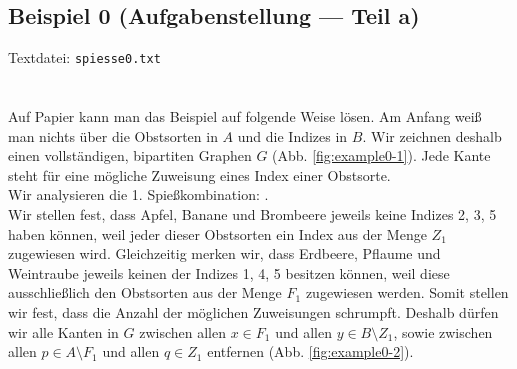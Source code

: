 \subsection{Beispiel 0 (Aufgabenstellung --- Teil a)}\label{example:0}
Textdatei: \texttt{spiesse0.txt}\\
\noindent
{}\\

\noindent
{}\\

Auf Papier kann man das Beispiel auf folgende Weise lösen.
Am Anfang weiß man nichts über die Obstsorten in $A$ und die Indizes in $B$.
Wir zeichnen deshalb einen vollständigen, bipartiten Graphen $G$ (Abb. \ref{fig:example0-1}).
Jede Kante steht für eine mögliche Zuweisung eines Index einer Obstsorte.\\

Wir analysieren die 1. Spießkombination:
.\\
Wir stellen fest, dass Apfel, Banane und Brombeere jeweils keine Indizes 2, 3, 5 haben können,
weil jeder dieser Obstsorten ein Index aus der Menge $Z_1$ zugewiesen wird.
Gleichzeitig merken wir, dass Erdbeere, Pflaume und Weintraube jeweils keinen der Indizes
1, 4, 5 besitzen können, weil diese ausschließlich den Obstsorten aus der Menge $F_1$ zugewiesen werden.
Somit stellen wir fest, dass die Anzahl der möglichen Zuweisungen schrumpft.
Deshalb dürfen wir alle Kanten in $G$ zwischen allen $x \in F_1$ und allen $y \in B \setminus Z_1$,
sowie zwischen allen $p \in A \setminus F_1$ und allen $q \in Z_1$ entfernen (Abb. \ref{fig:example0-2}).\\

